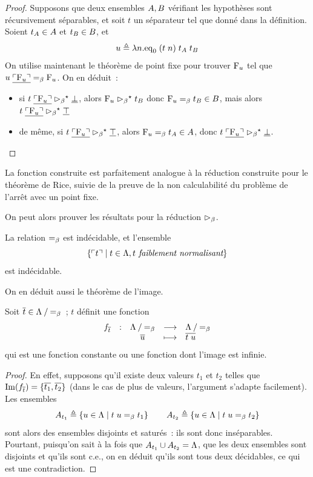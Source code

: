 \begin{proof}
  Supposons que deux ensembles $A,B$ vérifiant les hypothèses sont
  récursivement séparables, et soit $t$ un séparateur tel que donné dans la
  définition. Soient $t_{A} \in A$ et $t_{B} \in B$, et
  \[u \triangleq \lambda n.\mathrm{eq}_0\;(t\;n)\;t_{A}\;t_{B}\]
  On utilise maintenant le théorème de point fixe pour trouver $\mathrm{F}_{u}$ tel que
  $u\;\underline{\ulcorner\mathrm{F}_{u}\urcorner}=_{\beta} \mathrm{F}_{u}$. On en déduit~:
  \begin{itemize}
  \item si $t\;\underline{\ulcorner\mathrm{F}_{u}\urcorner}\mathrel{\rhd_{\beta}}^{\mathord{\star}} \underline{\bot}$, alors
    $\mathrm{F}_{u}\mathrel{\rhd_{\beta}}^{\mathord{\star}} t_{B}$
    donc $\mathrm{F}_{u} =_{\beta} t_{B} \in B$, mais alors
    $t\;\underline{\ulcorner\mathrm{F}_{u}\urcorner}\mathrel{\rhd_{\beta}}^{\mathord{\star}} \underline{\top}$
  \item de même, si $t\;\underline{\ulcorner\mathrm{F}_{u}\urcorner}\mathrel{\rhd_{\beta}}^{\mathord{\star}} \underline{\top}$,
    alors $\mathrm{F}_{u} =_{\beta} t_{A} \in A$, donc
    $t\;\underline{\ulcorner\mathrm{F}_{u}\urcorner}\mathrel{\rhd_{\beta}}^{\mathord{\star}} \underline{\bot}$.\qedhere
  \end{itemize}
\end{proof}

\begin{remark}
  La fonction construite est parfaitement analogue à la réduction construite
  pour le théorème de Rice, suivie de la preuve de la non calculabilité du
  problème de l'arrêt avec un point fixe.
\end{remark}

On peut alors prouver les résultats pour la réduction $\mathrel{\rhd_{\beta}}$.

\begin{theorem}
  La relation $=_{\beta}$ est indécidable, et l'ensemble
  \[\left\{ \ulcorner t\urcorner \;\middle\vert\; t \in \Lambda, t \textit{ faiblement normalisant} \right\}\]
  est indécidable.
\end{theorem}

On en déduit aussi le théorème de l'image.

\begin{theorem}[Image]
  Soit $\overline t \in \mathord{\Lambda}\mathbin{/}\mathord{=_{\beta}}$~; $t$ définit une fonction
  \[\makeFun{f_{\overline t}}{\quot{\lamSet}{\Beq}}{\quot{\lamSet}{\Beq}}
            {\clas{u}}{\clas{t\;u}}\]
  qui est une fonction constante ou une fonction dont l'image est infinie.
\end{theorem}

\begin{proof}
  En effet, supposons qu'il existe deux valeurs $t_1$ et $t_2$ telles que
  $\operatorname{Im}(f_{\overline{t}}) = \{\overline{t_1},\overline{t_2}\}$ (dans le cas de plus de valeurs,
  l'argument s'adapte facilement). Les ensembles
  \[A_{t_1} \triangleq \left\{ u \in \Lambda \;\middle\vert\; t\;u =_{\beta} t_1 \right\}\qquad
  A_{t_2}\triangleq \left\{ u \in \Lambda \;\middle\vert\; t\;u =_{\beta} t_2 \right\}\]
  sont alors des ensembles disjoints et saturés~: ils sont donc inséparables.
  Pourtant, puisqu'on sait à la fois que
  $A_{t_1}\cup A_{t_2} = \Lambda$, que les deux ensembles sont disjoints
  et qu'ils sont c.e., on en déduit qu'ils sont tous deux décidables, ce qui est
  une contradiction.
\end{proof}

